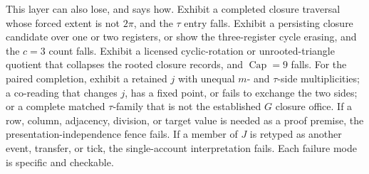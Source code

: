 This layer can also lose, and says how. Exhibit a completed closure traversal whose forced extent is not \(2\pi\), and the \(\tau\) entry falls. Exhibit a persisting closure candidate over one or two registers, or show the three-register cycle erasing, and the \(c=3\) count falls. Exhibit a licensed cyclic-rotation or unrooted-triangle quotient that collapses the rooted closure records, and \(\operatorname{Cap}=9\) falls. For the paired completion, exhibit a retained \(j\) with unequal \(m\)- and \(\tau\)-side multiplicities; a co-reading that changes \(j\), has a fixed point, or fails to exchange the two sides; or a complete matched \(\tau\)-family that is not the established \(G\) closure office. If a row, column, adjacency, division, or target value is needed as a proof premise, the presentation-independence fence fails. If a member of \(J\) is retyped as another event, transfer, or tick, the single-account interpretation fails. Each failure mode is specific and checkable.

